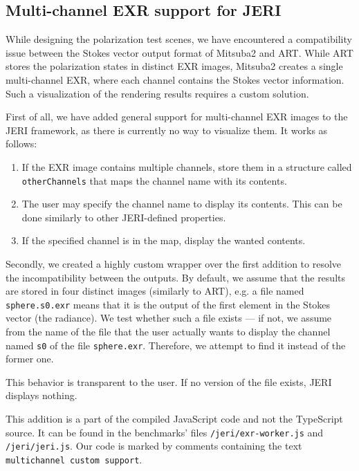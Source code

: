 \subsection{Multi-channel EXR support for JERI}
\label{sec:multichannel_jeri}

While designing the polarization test scenes, we have encountered a compatibility issue between the Stokes vector output format of Mitsuba2 and ART. While ART stores the polarization states in distinct EXR images, Mitsuba2 creates a single multi-channel EXR, where each channel contains the Stokes vector information. Such a visualization of the rendering results requires a custom solution.

First of all, we have added general support for multi-channel EXR images to the JERI framework, as there is currently no way to visualize them. It works as follows:

\begin{enumerate}
	\item If the EXR image contains multiple channels, store them in a structure called \texttt{otherChannels} that maps the channel name with its contents.
	\item The user may specify the channel name to display its contents. This can be done similarly to other JERI-defined properties.
	\item If the specified channel is in the map, display the wanted contents.
\end{enumerate}

Secondly, we created a highly custom wrapper over the first addition to resolve the incompatibility between the outputs. By default, we assume that the results are stored in four distinct images (similarly to ART), e.g. a file named \texttt{sphere.s0.exr} means that it is the output of the first element in the Stokes vector (the radiance). We test whether such a file exists --- if not, we assume from the name of the file that the user actually wants to display the channel named \texttt{s0} of the file \texttt{sphere.exr}. Therefore, we attempt to find it instead of the former one.

This behavior is transparent to the user. If no version of the file exists, JERI displays nothing.

This addition is a part of the compiled JavaScript code and not the TypeScript source. It can be found in the benchmarks' files \texttt{/jeri/exr-worker.js} and \texttt{/jeri/jeri.js}. Our code is marked by comments containing the text \texttt{multichannel custom support}.